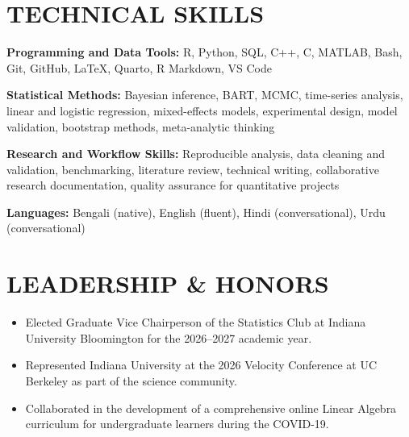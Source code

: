 \documentclass[10pt,letterpaper]{article}
\newenvironment{resumeItems}{%
  \begin{itemize}[
    label=\textbullet,
    leftmargin=14pt,
    labelsep=5pt,
    itemsep=0.5pt,
    topsep=1.0pt,
    parsep=0pt,
    partopsep=0pt
  ]
}{%
  \end{itemize}
}
\begin{document}
\section*{TECHNICAL SKILLS}

\textbf{Programming and Data Tools:}
R, Python, SQL, C++, C, MATLAB, Bash, Git, GitHub, LaTeX, Quarto, R Markdown, VS Code

\textbf{Statistical Methods:}
Bayesian inference, BART, MCMC, time-series analysis, linear and logistic regression, mixed-effects models, experimental design, model validation, bootstrap methods, meta-analytic thinking

\textbf{Research and Workflow Skills:}
Reproducible analysis, data cleaning and validation, benchmarking, literature review, technical writing, collaborative research documentation, quality assurance for quantitative projects

\textbf{Languages:}
Bengali (native), English (fluent), Hindi (conversational), Urdu (conversational)

\section*{LEADERSHIP \& HONORS}

\begin{resumeItems}
  \item Elected Graduate Vice Chairperson of the Statistics Club at Indiana University Bloomington for the 2026--2027 academic year.

  \item Represented Indiana University at the 2026 Velocity Conference at UC Berkeley as part of the science community.

  \item Collaborated in the development of a comprehensive online Linear Algebra curriculum for undergraduate learners during the COVID-19.

\end{resumeItems}
\end{document}
